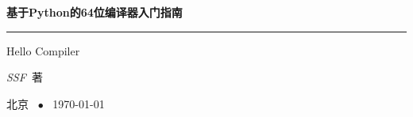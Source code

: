 \begin{titlepage}
  \vspace*{25ex}

  \hspace{0.05\textwidth}\begin{minipage}{.9\textwidth}
    \flushright

    {\textbf{基于Python的64位编译器入门指南}}

    \rule{\linewidth}{.5pt}

    \vspace{2ex}

    {\textsf{Hello Compiler}} \\

    \vspace{20ex}

    {\textit{SSF}~著}
  \end{minipage}

  \vfill

  \centering
  {北京 ~$\bullet$ ~\today}
\end{titlepage}